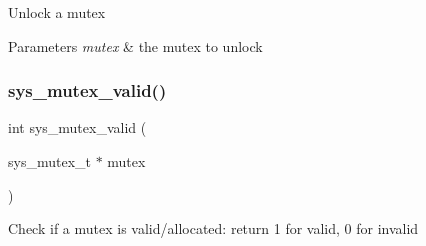 Unlock a mutex 
\begin{DoxyParams}{Parameters}
{\em mutex} & the mutex to unlock \\
\hline
\end{DoxyParams}
\mbox{\label{group__sys__mutex_gaebe83ba90a6d9c23cdb3eb5d49562c4a}} 
\subsubsection{\texorpdfstring{sys\+\_\+mutex\+\_\+valid()}{sys\_mutex\_valid()}}
{\footnotesize\ttfamily int sys\+\_\+mutex\+\_\+valid (\begin{DoxyParamCaption}\item[{sys\+\_\+mutex\+\_\+t $\ast$}]{mutex }\end{DoxyParamCaption})}

Check if a mutex is valid/allocated\+: return 1 for valid, 0 for invalid 